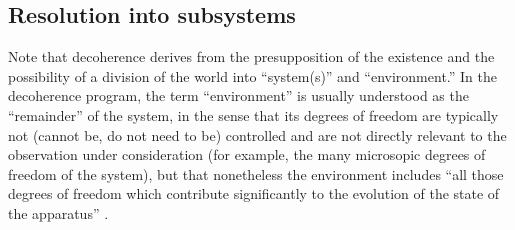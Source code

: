\documentclass[rmp,aps,amsmath,amsfonts,noshowkeys,noshowpacs,12pt]{revtex4}
\begin{document}
\subsection{Resolution into subsystems\label{sec:division}}

Note that decoherence derives from the presupposition of the existence
and the possibility of a division of the world into ``system(s)'' and
``environment.''  In the decoherence program, the term ``environment''
is usually understood as the ``remainder'' of the system, in the sense
that its degrees of freedom are typically not (cannot be, do not need
to be) controlled and are not directly relevant to the observation
under consideration (for example, the many microsopic degrees of
freedom of the system), but that nonetheless the environment includes
``all those degrees of freedom which contribute significantly to the
evolution of the state of the apparatus''
\citep[][p.~1520]{Zurek:1981:dd}.
\end{document}
